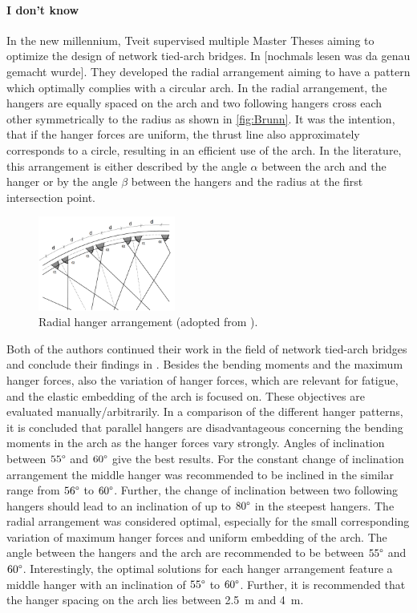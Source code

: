 \paragraph*{I don't know}
In the new millennium, Tveit supervised multiple Master Theses aiming to optimize the design of network tied-arch bridges. In \citep{BrunnSchanack} [nochmals lesen was da genau gemacht wurde]. They developed the radial arrangement aiming to have a pattern which optimally complies with a circular arch. In the radial arrangement, the hangers are equally spaced on the arch and two following hangers cross each other symmetrically to the radius as shown in \autoref{fig:Brunn}. It was the intention, that if the hanger forces are uniform, the thrust line also approximately corresponds to a circle, resulting in an efficient use of the arch. In the literature, this arrangement is either described by the angle $\alpha$ between the arch and the hanger or by the angle $\beta$ between the hangers and the radius at the first intersection point.

\begin{figure}[H]
\centering
\includegraphics[width=0.4\textwidth]{Pictures/RadialArrangement.PNG}
\caption{Radial hanger arrangement (adopted from \citep{BrunnSchanack2}).}
\label{fig:Brunn}
\end{figure}

Both of the authors continued their work in the field of network tied-arch bridges and conclude their findings in \citep{BrunnSchanack2}. Besides the bending moments and the maximum hanger forces, also the variation of hanger forces, which are relevant for fatigue, and the elastic embedding of the arch is focused on. These objectives are evaluated manually/arbitrarily. In a comparison of the different hanger patterns, it is concluded that parallel hangers are disadvantageous concerning the bending moments in the arch as the hanger forces vary strongly. Angles of inclination between $55\degree$ and $60\degree$ give the best results. For the constant change of inclination arrangement the middle hanger was recommended to be inclined in the similar range from $56\degree$ to $60\degree$. Further, the change of inclination between two following hangers should lead to an inclination of up to $80\degree$ in the steepest hangers. The radial arrangement was considered optimal, especially for the small corresponding variation of maximum hanger forces and uniform embedding of the arch. The angle between the hangers and the arch are recommended to be between $55\degree$ and $60\degree$. Interestingly, the optimal solutions for each hanger arrangement feature a middle hanger with an inclination of $55\degree$ to $60\degree$. Further, it is recommended that the hanger spacing on the arch lies between \SI{2.5}{m} and \SI{4}{m}.

